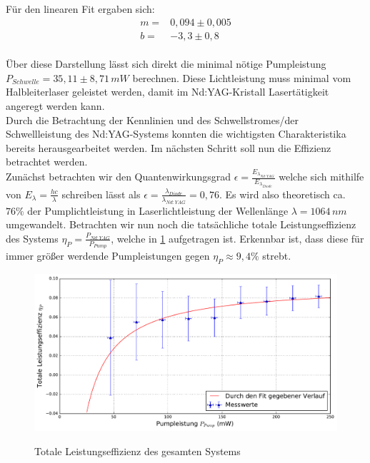\documentclass[twoside,colorback,accentcolor=tud4c,11pt]{tudreport}
\begin{document}
Für den linearen Fit ergaben sich:
\begin{align}
m=& 0,094 \pm 0,005\\
b=& -3,3 \pm 0,8
\end{align}\\
Über diese Darstellung lässt sich direkt die minimal nötige Pumpleistung $P_{Schwelle}=35,11\pm 8,71\,\si{mW} $ berechnen. Diese Lichtleistung muss minimal vom Halbleiterlaser geleistet werden, damit im Nd:YAG-Kristall Lasertätigkeit angeregt werden kann.\\
Durch die Betrachtung der Kennlinien und des Schwellstromes/der Schwellleistung des Nd:YAG-Systems konnten die wichtigsten Charakteristika bereits herausgearbeitet werden. Im nächsten Schritt soll nun die Effizienz betrachtet werden.\\
Zunächst betrachten wir den Quantenwirkungsgrad $\epsilon=\frac{E_{\lambda_{Nd:YAG}}}{E_{\lambda_{Diode}}}$ welche sich mithilfe von $E_{\lambda}=\frac{hc}{\lambda}$ schreiben lässt als $\epsilon=\frac{\lambda_{Diode}}{\lambda_{Nd:YAG}}=0,76$. Es wird also theoretisch ca. $76\%$ der Pumplichtleistung in Laserlichtleistung der Wellenlänge $\lambda=1064\,\si{nm}$ umgewandelt. Betrachten wir nun noch die tatsächliche totale Leistungseffizienz des Systems $\eta_{P}=\frac{P_{Nd:YAG}}{P_{Pump}}$, welche in \ref{toleist} aufgetragen ist. Erkennbar ist, dass diese für immer größer werdende Pumpleistungen gegen $\eta_{P}\approx 9,4\%$ strebt.
\begin{figure}[H]
\centering
   	\begin{minipage}[b]{0.9\textwidth}
   	\includegraphics[width=\textwidth]{graphics/tot_leisteff.pdf}
  	\label{toleist}
   	\end{minipage}
\caption{Totale Leistungseffizienz des gesamten Systems}	
\end{figure}
\end{document}
